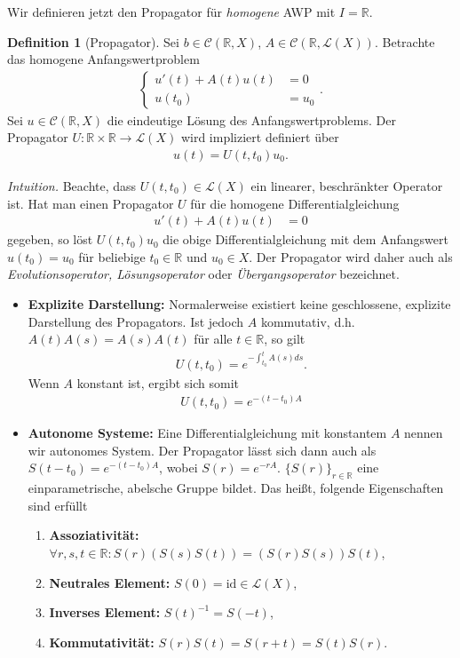 \documentclass[a4paper]{article}
\theoremstyle{definition}
\newtheorem{definition}[theorem]{Definition}
\begin{document}
Wir definieren jetzt den Propagator für \emph{homogene} AWP mit $I = \mathbb{R}$.
\begin{definition}[Propagator]
Sei $b \in \mathcal{C}(\mathbb{R}, X)$, $A \in \mathcal C(\mathbb{R}, \mathcal{L}(X))$. Betrachte das homogene Anfangswertproblem
\begin{align*}
    \begin{cases}
        u'(t) + A(t)u(t) &= 0 \\
        u(t_0) &= u_0
    \end{cases}.
\end{align*}
Sei $u \in \mathcal{C}(\mathbb{R}, X)$ die eindeutige Lösung des Anfangswertproblems. Der Propagator $U: \mathbb{R} \times \mathbb{R} \to \mathcal{L}(X)$ wird impliziert definiert über  
\begin{align*}
    u(t) = U(t,t_0)u_0.
\end{align*}
\end{definition}

\textit{Intuition.} Beachte, dass $U(t,t_0) \in \mathcal L(X)$ ein linearer, beschränkter Operator ist. Hat man einen Propagator $U$  für die homogene Differentialgleichung
\begin{align*}
    u'(t) + A(t)u(t) &= 0
\end{align*}
gegeben, so löst $U(t,t_0)u_0$ die obige Differentialgleichung mit dem Anfangswert $u(t_0) = u_0$ für beliebige $t_0 \in \mathbb{R}$ und $u_0 \in X$. Der Propagator wird daher auch als \emph{Evolutionsoperator, Lösungsoperator} oder \emph{Übergangsoperator} bezeichnet.

\begin{itemize}
    \item \textbf{Explizite Darstellung:} Normalerweise existiert keine geschlossene, explizite Darstellung des Propagators. Ist jedoch $A$ kommutativ, d.h. $A(t)A(s) = A(s)A(t)$ für alle $t \in \mathbb{R}$, so gilt 
    \begin{align*}
        U(t,t_0) = e^{-\int^t_{t_0}A(s)ds}.
    \end{align*}
    Wenn $A$ konstant ist, ergibt sich somit
    \begin{align*}
        U(t,t_0) = e^{-(t-t_0)A}
    \end{align*}
    \item \textbf{Autonome Systeme:} Eine Differentialgleichung mit konstantem $A$ nennen wir autonomes System. Der Propagator lässt sich dann auch als $S(t-t_0) = e^{-(t-t_0)A}$, wobei $S(r) = e^{-rA}$. $\{ S(r)\}_{r \in \mathbb{R}}$ eine einparametrische, abelsche Gruppe bildet. Das hei\ss t, folgende Eigenschaften sind erfüllt 
    \begin{enumerate}
        \item \textbf{Assoziativität:} $\forall r,s,t \in \mathbb{R}: S(r)(S(s)S(t)) = (S(r)S(s))S(t)$,
        \item \textbf{Neutrales Element:} $S(0) = \mathrm{id} \in \mathcal{L}(X)$,
        \item \textbf{Inverses Element:} $S(t)^{-1} = S(-t)$,
        \item \textbf{Kommutativität:} $S(r)S(t) = S(r+t) = S(t)S(r)$.
    \end{enumerate}
\end{itemize}
\end{document}
